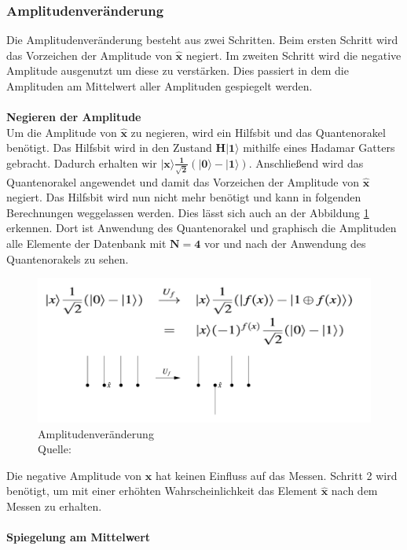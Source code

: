 \subsubsection{Amplitudenveränderung}
Die Amplitudenveränderung besteht aus zwei Schritten. Beim ersten Schritt wird das Vorzeichen der Amplitude von $\mathbf{\hat x}$ negiert. Im zweiten Schritt wird die negative Amplitude ausgenutzt um diese zu verstärken. Dies passiert in dem die Amplituden am Mittelwert aller Amplituden gespiegelt werden. 
\\ \\
\textbf{Negieren der Amplitude}
 \\
Um die Amplitude von $\mathbf{\hat x}$ zu negieren, wird ein Hilfsbit und das Quantenorakel benötigt. Das Hilfsbit wird in den Zustand $\mathbf{H|1\rangle}$ mithilfe eines Hadamar Gatters gebracht. Dadurch erhalten wir $\mathbf{|x\rangle \frac{1}{\sqrt 2}(|0\rangle - |1\rangle )}$. Anschließend wird das Quantenorakel angewendet und damit das Vorzeichen der Amplitude von $\mathbf{\hat{x}}$ negiert. Das Hilfsbit wird nun nicht mehr benötigt und kann in folgenden Berechnungen weggelassen werden. Dies lässt sich auch an der Abbildung \ref{fig:changeAmplitude} erkennen. Dort ist Anwendung des Quantenorakel und graphisch die Amplituden alle Elemente der Datenbank mit $\mathbf{N=4}$ vor und nach der Anwendung des Quantenorakels zu sehen.
\begin{figure}[hbtp]
	\centering
	\includegraphics[width=.8\textwidth]{figures/amplitudenveraenderung.png}
	\caption{Amplitudenveränderung \\ Quelle: \cite[S. 141]{Ho17}}
	\label{fig:changeAmplitude}
\end{figure}
Die negative Amplitude von $\mathbf{\hat x}$ hat keinen Einfluss auf das Messen. Schritt 2 wird benötigt, um mit einer erhöhten Wahrscheinlichkeit das Element $\mathbf{\hat x}$ nach dem Messen zu erhalten.
\\\\
\textbf{Spiegelung am Mittelwert} \\
\label{sec:spiegelnAmMittelwert} 
